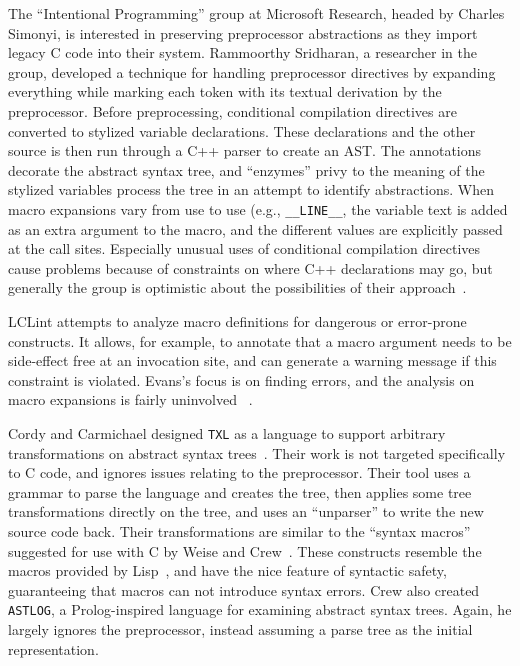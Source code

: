 \documentclass{article}
\newcommand{\CPP}{\mbox{\textsf{C++}}}
\newcommand{\C}{\mbox{\textsf{C}}}
\newcommand{\eg}{e.g.,}
\begin{document}
The ``Intentional Programming'' group at Microsoft Research, headed by
Charles Simonyi, is interested in preserving preprocessor abstractions
as they import legacy \C{} code into their system.  Rammoorthy
Sridharan, a researcher in the group, developed a technique for handling
preprocessor directives by expanding everything while marking each token
with its textual derivation by the preprocessor.  Before preprocessing,
conditional compilation directives are converted to stylized variable
declarations. These declarations and the other source is then run
through a \CPP{} parser to create an AST.  The annotations decorate the
abstract syntax tree, and ``enzymes'' privy to the meaning of the
stylized variables process the tree in an attempt to identify
abstractions.  When macro expansions vary from use to use (\eg{}
\texttt{\_\_LINE\_\_}, the variable text is added as an extra argument
to the macro, and the different values are explicitly passed at the call
sites. Especially unusual uses of conditional compilation directives
cause problems because of constraints on where \CPP{} declarations may
go, but generally the group is optimistic about the possibilities of
their approach~\cite{MSIPPersonal}.

LCLint attempts to analyze macro definitions for
dangerous or error-prone constructs.  It allows, for example, to
annotate that a macro argument needs to be side-effect free at an
invocation site, and can generate a warning message if this constraint
is violated.  Evans's focus is on finding errors, and the
analysis on macro expansions is fairly uninvolved
~\cite[Ch.~8]{LCLint}.

Cordy and Carmichael designed \texttt{TXL} as a language to support
arbitrary transformations on abstract syntax trees~\cite{TXL}.  Their
work is not targeted specifically to \C{} code, and ignores issues
relating to the preprocessor.  Their tool uses a grammar to parse the
language and creates the tree, then applies some tree transformations
directly on the tree, and uses an ``unparser'' to write the new source
code back.  Their transformations are similar to the ``syntax macros''
suggested for use with \C{} by Weise and Crew~\cite{Weise93}.  These
constructs resemble the macros provided by Lisp~\cite{Steele90}, and
have the nice feature of syntactic safety, guaranteeing that macros can
not introduce syntax errors. Crew also created \texttt{ASTLOG}, a
\textsf{Prolog}-inspired language for examining abstract syntax trees.
Again, he largely ignores the preprocessor, instead assuming a parse
tree as the initial representation.
\end{document}
